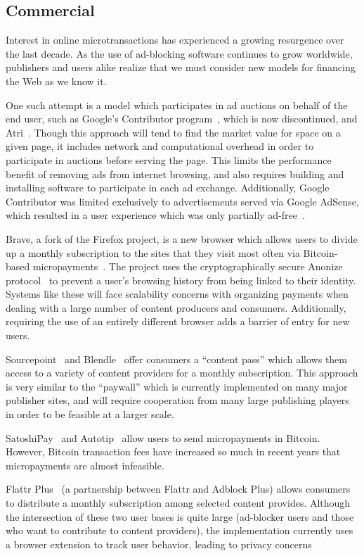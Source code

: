 \subsection{Commercial}
Interest in online microtransactions has experienced a growing resurgence over the last decade.
As the use of ad-blocking software continues to grow worldwide, publishers and users alike realize that we must consider new models for financing the Web as we know it.

One such attempt is a model which participates in ad auctions on
behalf of the end user, such as Google's Contributor
program~\cite{contributor}, which is now discontinued, and
Atri~\cite{atri}. Though this approach will tend to find the market
value for space on a given page, it includes network and computational
overhead in order to participate in auctions before serving the
page. This limits the performance benefit of removing ads from
internet browsing, and also requires building and installing software
to participate in each ad exchange. Additionally, Google Contributor
was limited exclusively to advertisements served via Google AdSense,
which resulted in a user experience which was only partially
ad-free~\cite{adsense}.

Brave, a fork of the Firefox project, is a new browser which allows
users to divide up a monthly subscription to the sites that they visit
most often via Bitcoin-based micropayments~\cite{brave}. The project
uses the cryptographically secure Anonize protocol~\cite{anonize} to
prevent a user's browsing history from being linked to their
identity. Systems like these will face scalability concerns with
organizing payments when dealing with a large number of content
producers and consumers. Additionally, requiring the use of an
entirely different browser adds a barrier of entry for new users.

Sourcepoint~\cite{sourcepoint} and Blendle~\cite{blendle} offer consumers a
“content pass” which allows them access to a variety of content
providers for a monthly subscription. This approach is very similar to
the “paywall” which is currently implemented on many major publisher
sites, and will require cooperation from many large publishing players
in order to be feasible at a larger scale.

SatoshiPay~\cite{satoshi} and Autotip~\cite{autotip} allow users to
send micropayments in Bitcoin. However, Bitcoin transaction fees have
increased so much in recent years that micropayments are almost
infeasible.

Flattr Plus~\cite{flattrplus} (a partnership between Flattr and
Adblock Plus) allows consumers to distribute a monthly subscription
among selected content provides. Although the intersection of these
two user bases is quite large (ad-blocker users and those who want to
contribute to content providers), the implementation currently uses a
browser extension to track user behavior, leading to privacy concerns
